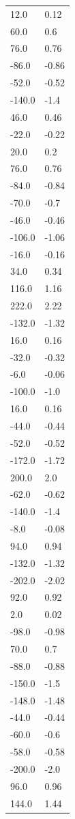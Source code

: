 \begin{longtable}{ll}
12.0 & 0.12 \\
60.0 & 0.6 \\
76.0 & 0.76 \\
-86.0 & -0.86 \\
-52.0 & -0.52 \\
-140.0 & -1.4 \\
46.0 & 0.46 \\
-22.0 & -0.22 \\
20.0 & 0.2 \\
76.0 & 0.76 \\
-84.0 & -0.84 \\
-70.0 & -0.7 \\
-46.0 & -0.46 \\
-106.0 & -1.06 \\
-16.0 & -0.16 \\
34.0 & 0.34 \\
116.0 & 1.16 \\
222.0 & 2.22 \\
-132.0 & -1.32 \\
16.0 & 0.16 \\
-32.0 & -0.32 \\
-6.0 & -0.06 \\
-100.0 & -1.0 \\
16.0 & 0.16 \\
-44.0 & -0.44 \\
-52.0 & -0.52 \\
-172.0 & -1.72 \\
200.0 & 2.0 \\
-62.0 & -0.62 \\
-140.0 & -1.4 \\
-8.0 & -0.08 \\
94.0 & 0.94 \\
-132.0 & -1.32 \\
-202.0 & -2.02 \\
92.0 & 0.92 \\
2.0 & 0.02 \\
-98.0 & -0.98 \\
70.0 & 0.7 \\
-88.0 & -0.88 \\
-150.0 & -1.5 \\
-148.0 & -1.48 \\
-44.0 & -0.44 \\
-60.0 & -0.6 \\
-58.0 & -0.58 \\
-200.0 & -2.0 \\
96.0 & 0.96 \\
144.0 & 1.44 \\

\end{longtable}
